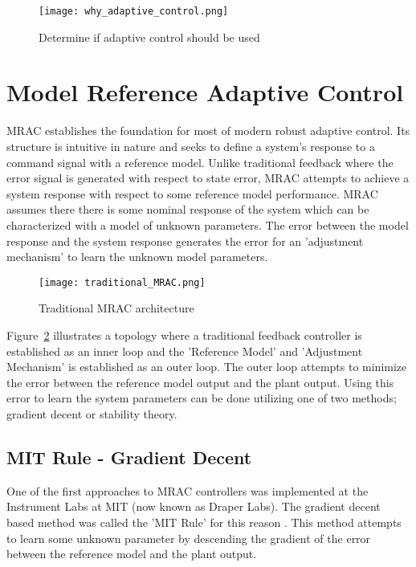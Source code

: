

\begin{figure}[h!]
 \centering
  \texttt{[image: why\_adaptive\_control.png]}
  \caption{Determine if adaptive control should be used}
  \label{fig:why_adaptive_control}
\end{figure}


\section{Model Reference Adaptive Control}
\ac{MRAC} establishes the foundation for most of modern robust adaptive control.  Its structure is intuitive in nature and seeks to define a system's response to a command signal with a reference model.  Unlike traditional feedback where the error signal is generated with respect to state error, \ac{MRAC} attempts to achieve a system response with respect to some reference model performance. \ac{MRAC} assumes there there is some nominal response of the system which can be characterized with a model of unknown parameters.  The error between the model response and the system response generates the error for an 'adjustment mechanism' to learn the unknown model parameters.

\begin{figure}[h!]
 \centering
  \texttt{[image: traditional\_MRAC.png]}
  \caption{Traditional \ac{MRAC} architecture }
  \label{fig:traditional_mrac}
\end{figure}

Figure~\ref{fig:traditional_mrac} illustrates a topology where a traditional feedback controller is established as an inner loop and the 'Reference Model' and 'Adjustment Mechanism' is established as an outer loop.  The outer loop attempts to minimize the error between the reference model output and the plant output.  Using this error to learn the system parameters can be done utilizing one of two methods; gradient decent or stability theory.

\subsection{MIT Rule - Gradient Decent}
One of the first approaches to \ac{MRAC} controllers was implemented at the Instrument Labs at MIT (now known as Draper Labs).  The gradient decent based method was called the 'MIT Rule' for this reason \cite{aastrom2013adaptive}.  This method attempts to learn some unknown parameter by descending the gradient of the error between the reference model and the plant output.

